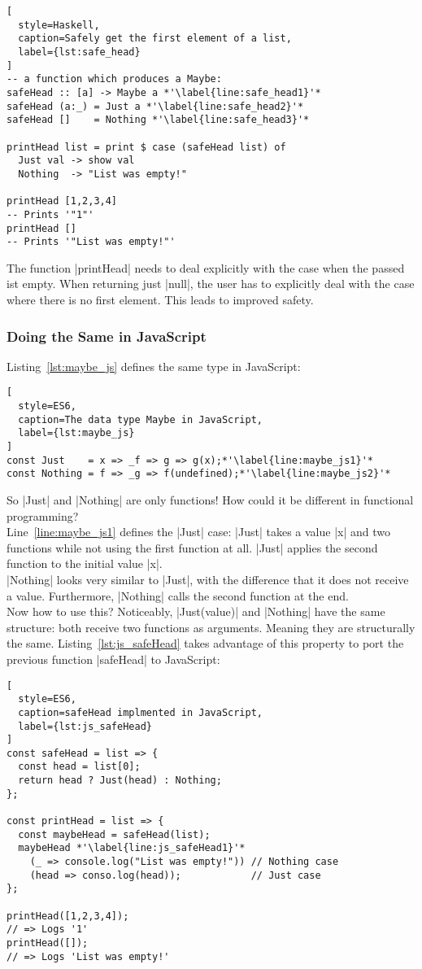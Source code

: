 \begin{lstlisting}[
  style=Haskell,
  caption=Safely get the first element of a list,
  label={lst:safe_head}
]
-- a function which produces a Maybe:
safeHead :: [a] -> Maybe a *'\label{line:safe_head1}'*
safeHead (a:_) = Just a *'\label{line:safe_head2}'*
safeHead []    = Nothing *'\label{line:safe_head3}'*

printHead list = print $ case (safeHead list) of 
  Just val -> show val
  Nothing  -> "List was empty!"

printHead [1,2,3,4]
-- Prints '"1"'
printHead []
-- Prints '"List was empty!"'
\end{lstlisting}

The function |printHead| needs to deal explicitly with the case when the passed
ist empty. When returning just |null|, the user has to explicitly deal with the
case where there is no first element. This leads to improved safety.

\subsubsection{Doing the Same in JavaScript} %
\label{subsub:Doing the same in JavaScript}
Listing~\ref{lst:maybe_js} defines the same type in JavaScript:
\begin{lstlisting}[
  style=ES6,
  caption=The data type Maybe in JavaScript,
  label={lst:maybe_js}
]
const Just    = x => _f => g => g(x);*'\label{line:maybe_js1}'*
const Nothing = f => _g => f(undefined);*'\label{line:maybe_js2}'*
\end{lstlisting}

So |Just| and |Nothing| are only functions! How could it be different in
functional programming? \\ 
Line~\ref{line:maybe_js1} defines the |Just| case:
|Just| takes a value |x| and two functions while not using the first function
at all. |Just| applies the second function to the initial value |x|. \\ 
|Nothing| looks very similar to |Just|, with the difference that it does not
receive a value. Furthermore, |Nothing| calls the second function at the end.\\ 
Now how to use this? Noticeably, |Just(value)| and |Nothing| have the same
structure: both receive two functions as arguments. Meaning they are
structurally the same. Listing~\ref{lst:js_safeHead} takes advantage of this
property to port the previous function |safeHead| to JavaScript:

\begin{lstlisting}[
  style=ES6,
  caption=safeHead implmented in JavaScript,
  label={lst:js_safeHead}
]
const safeHead = list => {
  const head = list[0];
  return head ? Just(head) : Nothing;
};

const printHead = list => {
  const maybeHead = safeHead(list);
  maybeHead *'\label{line:js_safeHead1}'*
    (_ => console.log("List was empty!")) // Nothing case
    (head => conso.log(head));            // Just case
};

printHead([1,2,3,4]);
// => Logs '1'
printHead([]);
// => Logs 'List was empty!'
\end{lstlisting}

